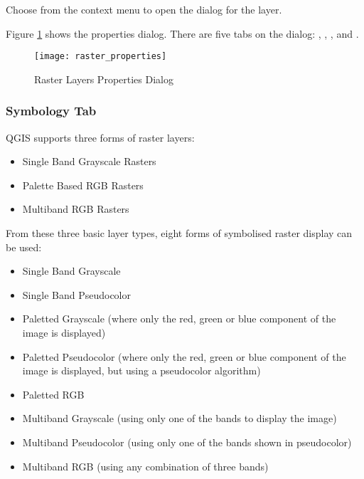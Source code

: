 Choose  from the context menu to open the 
dialog for the layer.

Figure \ref{fig:raster_properties} shows the properties dialog. There are five
tabs on the dialog: , , ,  and .

\begin{figure}[h]
   \begin{center}
   \caption{Raster Layers Properties
Dialog}\label{fig:raster_properties}\smallskip
   \texttt{[image: raster\_properties]}
\end{center}  
\end{figure}

\subsubsection{Symbology Tab}\label{label_sombology}

QGIS supports three forms of raster layers:

\begin{itemize}
\item Single Band Grayscale Rasters
\item Palette Based RGB Rasters
\item Multiband RGB Rasters
\end{itemize}

From these three basic layer types, eight forms of symbolised raster display
can be used:

\begin{itemize}
\item Single Band Grayscale
\item Single Band Pseudocolor
\item Paletted Grayscale (where only the red, green or blue component of the
image is displayed)
\item Paletted Pseudocolor (where only the red, green or blue component of the
image is displayed, but using a pseudocolor algorithm)
\item Paletted RGB
\item Multiband Grayscale (using only one of the bands to display the image)
\item Multiband Pseudocolor (using only one of the bands shown in
pseudocolor)
\item Multiband RGB (using any combination of three bands)
\end{itemize}

